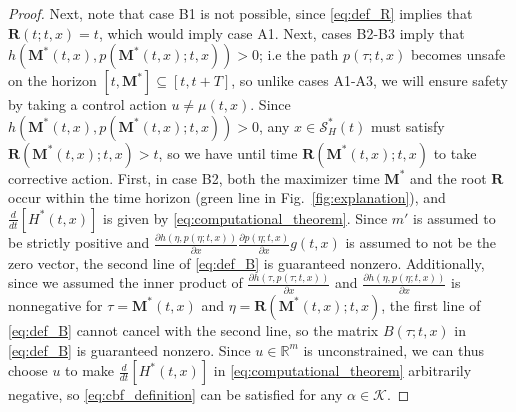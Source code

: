 \documentclass[10pt,conference]{ieeeconf}
\renewcommand{\(}{\left(}
\renewcommand{\)}{\right)}
\renewcommand{\[}{\left[}
\renewcommand{\]}{\right]}
\newcommand{\reals}{\mathbb{R}}
\begin{document}
\begin{proof}
Next, note that case B1 is not possible, since \eqref{eq:def_R} implies that $\boldsymbol{R}(t;t,x) = t$, which would imply case A1. 
Next, cases B2-B3 %
imply that $h(\boldsymbol{M}^*(t,x),p(\boldsymbol{M}^*(t,x);t,x)) > 0$; i.e the path $p(\tau;t,x)$ becomes unsafe on the horizon $[t,\boldsymbol{M}^*]\subseteq [t,t+T]$, so unlike cases A1-A3, we will ensure safety by taking a control action $u \neq \mu(t,x)$. Since $h(\boldsymbol{M}^*(t,x),p(\boldsymbol{M}^*(t,x);t,x)) > 0$, any $x \in \mathcal{S}_H^*(t)$ must satisfy $\boldsymbol{R}(\boldsymbol{M}^*(t,x);t,x) > t$, so we have until time $\boldsymbol{R}(\boldsymbol{M}^*(t,x);t,x)$ to take corrective action.
First, in case B2, both the maximizer time $\boldsymbol{M}^*$ and the root $\boldsymbol{R}$ occur within the time horizon (green line in Fig.~\ref{fig:explanation}), and $\frac{d}{dt}[H^*(t,x)]$ is given by \eqref{eq:computational_theorem}. Since $m'$ is assumed to be strictly positive and $\frac{\partial h(\eta, p(\eta; t,x))}{\partial x}\frac{\partial p(\eta; t,x)}{\partial x} g(t,x)$ is assumed to not be the zero vector, the second line of \eqref{eq:def_B} is guaranteed nonzero. Additionally, since we assumed the inner product of $\frac{\partial h(\tau, p(\tau;t,x))}{\partial x}$ and $\frac{\partial h(\eta, p(\eta;t,x))}{\partial x}$ is nonnegative for $\tau = \boldsymbol{M}^*(t,x)$ and $\eta = \boldsymbol{R}(\boldsymbol{M}^*(t,x);t,x)$, the first line of \eqref{eq:def_B} cannot cancel with the second line, so the matrix $B(\tau;t,x)$ in \eqref{eq:def_B} is guaranteed nonzero. Since $u \in \reals^m$ is unconstrained, we can thus choose $u$ to make $\frac{d}{dt}[H^*(t,x)]$  in \eqref{eq:computational_theorem} arbitrarily negative, so \eqref{eq:cbf_definition} can be satisfied for any $\alpha \in \mathcal{K}$.


\end{proof}
\end{document}
